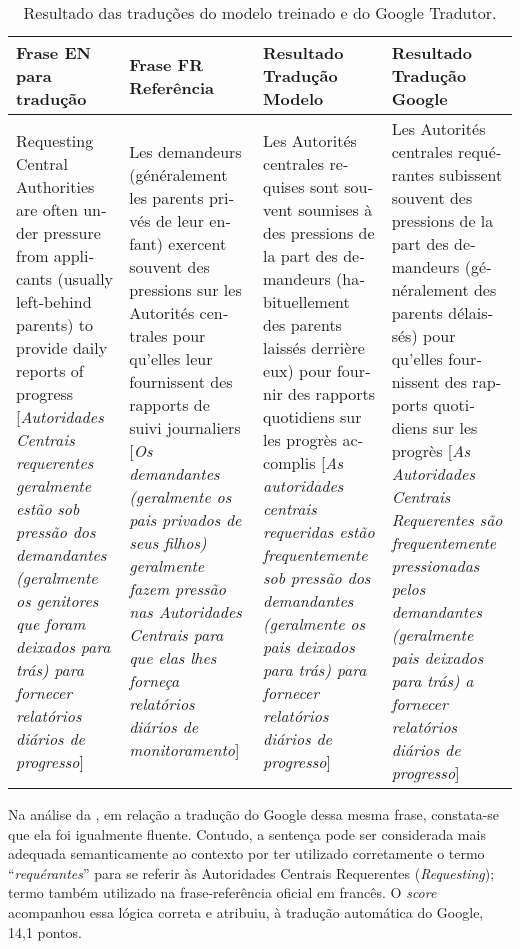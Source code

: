 \documentclass[portuguese]{textolivre}
\begin{document}
\begin{table}[!htpb]
\centering
\begin{threeparttable}
\caption{Resultado das traduções do modelo treinado e do Google Tradutor.}
\label{tab-04}
\begin{tabular}{*{4}{p{3.5cm}}}
\toprule
Frase EN para tradução &
Frase FR Referência &
Resultado Tradução Modelo &
Resultado Tradução Google\\
\midrule
\foreignlanguage{english}{Requesting Central Authorities are often under pressure from applicants (usually left-behind parents) to provide daily reports of progress}
[\textit{Autoridades Centrais requerentes geralmente estão sob pressão dos demandantes (geralmente os genitores que foram deixados para trás) para fornecer relatórios diários de progresso}] &
\foreignlanguage{french}{Les demandeurs (généralement les parents privés de leur enfant) exercent souvent des pressions sur les Autorités centrales pour qu’elles leur fournissent des rapports de suivi journaliers}
[\textit{Os demandantes (geralmente os pais privados de seus filhos) geralmente fazem pressão nas Autoridades Centrais para que elas lhes forneça relatórios diários de monitoramento}] &
\foreignlanguage{french}{Les Autorités centrales requises sont souvent soumises à des pressions de la part des demandeurs (habituellement des parents laissés derrière eux) pour fournir des rapports quotidiens sur les progrès accomplis}
[\textit{As autoridades centrais requeridas estão frequentemente sob pressão dos demandantes (geralmente os pais deixados para trás) para fornecer relatórios diários de progresso}] &
\foreignlanguage{french}{Les Autorités centrales requérantes subissent souvent des pressions de la part des demandeurs (généralement des parents délaissés) pour qu'elles fournissent des rapports quotidiens sur les progrès}
[\textit{As Autoridades Centrais Requerentes são frequentemente pressionadas pelos demandantes (geralmente pais deixados para trás) a fornecer relatórios diários de progresso}]  \\
\bottomrule
\end{tabular}
\end{threeparttable}
\end{table}

Na análise da , em relação a tradução do Google dessa mesma frase, constata-se que ela foi igualmente fluente. Contudo, a sentença pode ser considerada mais adequada semanticamente ao contexto por ter utilizado corretamente o termo “\textit{requérantes}” para se referir às Autoridades Centrais Requerentes (\textit{Requesting}); termo também utilizado na frase-referência oficial em francês. O \textit{score} acompanhou essa lógica correta e atribuiu, à tradução automática do Google, 14,1 pontos.
\end{document}
